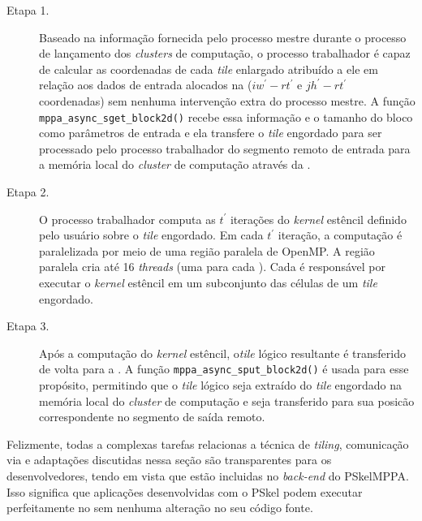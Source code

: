 \begin{description}

	\item[Etapa 1.] Baseado na informação fornecida pelo processo mestre durante o processo de lançamento dos \emph{clusters} de computação, o processo trabalhador é capaz de calcular as coordenadas de cada \emph{tile} enlargado atribuído a ele em relação aos dados de entrada alocados na \lpddr ($iw^\prime - rt^\prime$ e $jh^\prime - rt^\prime$ coordenadas) sem nenhuma intervenção extra do processo mestre. A função \texttt{mppa\_async\_sget\_block2d()} recebe essa informação e o tamanho do bloco como parâmetros de entrada e ela transfere o \emph{tile} engordado para ser processado pelo processo trabalhador do segmento remoto de entrada para a memória local do \emph{cluster} de computação através da \noc.

	\item[Etapa 2.] O processo trabalhador computa as $t^\prime$ iterações do \emph{kernel} estêncil definido pelo usuário sobre o \emph{tile} engordado. Em cada $t^\prime$ iteração, a computação é paralelizada por meio de uma região paralela de OpenMP. A região paralela cria até 16 \emph{threads} (uma para cada \pe). Cada \pe é responsável por executar o \emph{kernel} estêncil em um subconjunto das células de um \emph{tile} engordado.

	\item[Etapa 3.] Após a computação do \emph{kernel} estêncil, o\emph{tile} lógico resultante é transferido de volta para a \lpddr. A função \texttt{mppa\_async\_sput\_block2d()} é usada para esse propósito, permitindo que o \emph{tile} lógico seja extraído do \emph{tile} engordado na memória local do \emph{cluster} de computação e seja transferido para sua posicão correspondente no segmento de saída remoto.

\end{description}

Felizmente, todas a complexas tarefas relacionas a técnica de \emph{tiling}, comunicação via \noc e adaptações discutidas nessa seção são transparentes para os desenvolvedores, tendo em vista que estão incluidas no \emph{back-end} do PSkelMPPA. Isso significa que aplicações desenvolvidas com o \fw PSkel podem executar perfeitamente no \mppa sem nenhuma alteração no seu código fonte.
